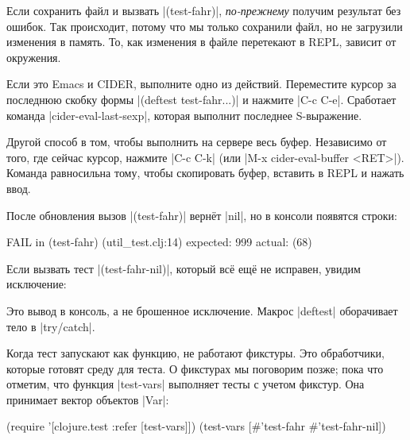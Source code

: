 Если сохранить файл и вызвать \spverb|(test-fahr)|, \emph{по-прежнему} получим
результат без ошибок. Так происходит, потому что мы только сохранили файл, но не
загрузили изменения в память. То, как изменения в файле перетекают в REPL,
зависит от окружения.


Если это Emacs и CIDER, выполните одно из действий. Переместите курсор за
последнюю скобку формы \spverb|(deftest test-fahr...)| и нажмите \spverb|C-c C-e|.
Сработает команда \spverb|cider-eval-last-sexp|, которая выполнит последнее S-выражение.

Другой способ в том, чтобы выполнить на сервере весь буфер. Независимо от того,
где сейчас курсор, нажмите \spverb|C-c C-k| (или \spverb|M-x cider-eval-buffer <RET>|).
Команда равносильна тому, чтобы скопировать буфер, вставить в REPL и нажать ввод.

После обновления вызов \spverb|(test-fahr)| верн\"{е}т \spverb|nil|, но в консоли
появятся строки:

\begin{english}
  \begin{clojure}
FAIL in (test-fahr) (util_test.clj:14)
expected: 999
  actual: (68)
  \end{clojure}
\end{english}

Если вызвать тест \spverb|(test-fahr-nil)|, который вс\"{е} ещ\"{е} не исправен,
увидим исключение:

\begin{english}
\end{english}

Это вывод в консоль, а не брошенное исключение. Макрос \spverb|deftest|
оборачивает тело в \spverb|try/catch|.

Когда тест запускают как функцию, не работают фикстуры. Это обработчики, которые
готовят среду для теста. О фикстурах мы поговорим позже; пока что отметим, что
функция \spverb|test-vars| выполняет тесты с учетом фикстур. Она принимает
вектор объектов \spverb|Var|:

\begin{english}
  \begin{clojure}
(require '[clojure.test :refer [test-vars]])
(test-vars [#'test-fahr #'test-fahr-nil])
  \end{clojure}
\end{english}

